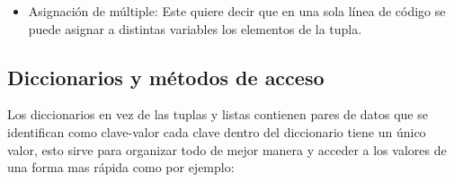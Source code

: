 \begin{itemize}
    \item Asignación de múltiple: Este quiere decir que en una sola línea de código se puede asignar a distintas variables los elementos de la tupla. 
    \begin{figure}[h]
        \centering
      \end{figure}

\end{itemize}

\subsection{Diccionarios y métodos de acceso}
Los diccionarios en vez de las tuplas y listas contienen pares de datos que se identifican como clave-valor cada clave dentro del diccionario tiene un único valor, esto sirve para organizar todo de mejor manera y acceder a los valores de una forma mas rápida como por ejemplo:

